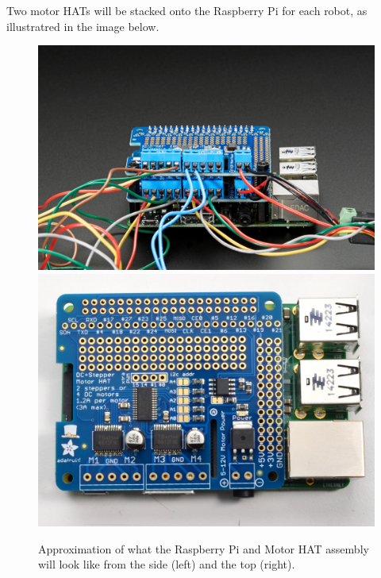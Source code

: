 Two motor HATs will be stacked onto the Raspberry Pi for each robot, as illustratred in the image below.

\begin{figure}
\centering
\includegraphics[width=0.45\columnwidth]{figs/HATs-on-pi.jpg}
\includegraphics[width=0.45\columnwidth]{figs/HAT-on-pi.jpg}
\caption{Approximation of what the Raspberry Pi and Motor HAT assembly will look like from the side (left) and the top (right).}
\label{fig:HATs}
\end{figure}